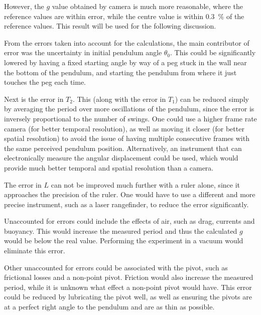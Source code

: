 \documentclass[a4paper]{scrartcl}
\begin{document}
However, the \(g\) value obtained by camera is much more reasonable, where the reference values are within error, while the centre value is within \SI{0.3}{\percent} of the reference values. This result will be used for the following discussion.

From the errors taken into account for the calculations, the main contributor of error was the uncertainty in initial pendulum angle \(\theta_0\). This could be significantly lowered by having a fixed starting angle by way of a peg stuck in the wall near the bottom of the pendulum, and starting the pendulum from where it just touches the peg each time.

Next is the error in \(T_2\). This (along with the error in \(T_1\)) can be reduced simply by averaging the period over more oscillations of the pendulum, since the error is inversely proportional to the number of swings. One could use a higher frame rate camera (for better temporal resolution), as well as moving it closer (for better spatial resolution) to avoid the issue of having multiple consecutive frames with the same perceived pendulum position. Alternatively, an instrument that can electronically measure the angular displacement could be used, which would provide much better temporal and spatial resolution than a camera.

The error in \(L\) can not be improved much further with a ruler alone, since it approaches the precision of the ruler. One would have to use a different and more precise instrument, such as a laser rangefinder, to reduce the error significantly.

Unaccounted for errors could include the effects of air, such as drag, currents and buoyancy. This would increase the measured period and thus the calculated \(g\) would be below the real value. Performing the experiment in a vacuum would eliminate this error.

Other unaccounted for errors could be associated with the pivot, such as frictional losses and a non-point pivot. Friction would also increase the measured period, while it is unknown what effect a non-point pivot would have. This error could be reduced by lubricating the pivot well, as well as ensuring the pivots are at a perfect right angle to the pendulum and are as thin as possible.

\printbibliography
\end{document}
